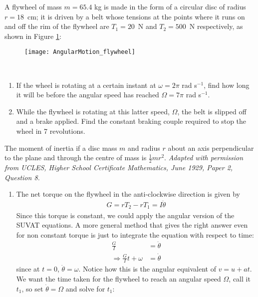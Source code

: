 \begin{hint}[HSC1929MIIQ8a] %
{A flywheel of mass $m = 65.4$ kg is made in the form of a circular disc of radius $r = 18$~cm; it is driven by a belt whose tensions at the points where it runs on and off the rim of the flywheel are $T_{1} = 20$~N and $T_{2} = 500$~N respectively, as shown in Figure \ref{fig:AngularMotion_flywheel}:
\begin{figure}[h]
\centering
\texttt{[image: AngularMotion\_flywheel]}
\caption{}
\label{fig:AngularMotion_flywheel}
\end{figure}
\\
\begin{enumerate}
\item If the wheel is rotating at a certain instant at $\omega = 2\pi$ rad s$^{-1}$, find how long it will be before the angular speed has reached $\Omega = 7 \pi$ rad s$^{-1}$.  
\item While the flywheel is rotating at this latter speed, $\Omega$, the belt is slipped off and a brake applied.  Find the constant braking couple required to stop the wheel in 7 revolutions.
\end{enumerate}
}
{
The moment of inertia if a disc mass $m$ and radius $r$ about an axis perpendicular to the plane and through the centre of mass is $\frac{1}{2}mr^2$. 
}
{\textit{Adapted with permission from UCLES, Higher School Certificate Mathematics, June 1929, Paper 2, Question 8.}}
{
\begin{enumerate}
\item
The net torque on the flywheel in the anti-clockwise direction is given by 
\begin{align*}
G=rT_2-rT_1=I\ddot\theta
\end{align*}
Since this torque is constant, we could apply the angular version of the SUVAT equations. A more general method that gives the right answer even for non constant torque is just to integrate the equation with respect to time:
\begin{align*}
\frac{G}{I}&=\ddot\theta \\
\Rightarrow \frac{G}{I}t+\omega&=\dot\theta
\end{align*}
since at $t=0$, $\dot\theta=\omega$. Notice how this is the angular equivalent of $v=u+at$. We want the time taken for the flywheel to reach an angular speed $\Omega$, call it $t_1$, so set $\dot\theta=\Omega$ and solve for $t_1$:

\end{enumerate}}
\end{hint}
